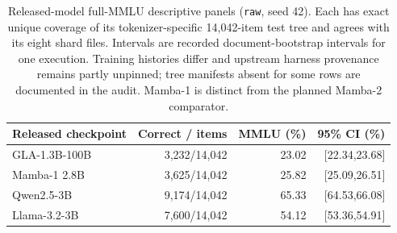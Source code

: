 \begin{table}[t]
\centering\small
\begin{tabular}{@{}lrrr@{}}
\toprule
Released checkpoint & Correct / items & MMLU (\%) & 95\% CI (\%)\\
\midrule
GLA-1.3B-100B & 3,232/14,042 & 23.02 & [22.34,23.68]\\
Mamba-1 2.8B & 3,625/14,042 & 25.82 & [25.09,26.51]\\
Qwen2.5-3B & 9,174/14,042 & 65.33 & [64.53,66.08]\\
Llama-3.2-3B & 7,600/14,042 & 54.12 & [53.36,54.91]\\
\bottomrule
\end{tabular}
\caption{Released-model full-MMLU descriptive panels (\texttt{raw}, seed 42). Each has exact unique coverage of its tokenizer-specific 14,042-item test tree and agrees with its eight shard files. Intervals are recorded document-bootstrap intervals for one execution. Training histories differ and upstream harness provenance remains partly unpinned; tree manifests absent for some rows are documented in the audit. Mamba-1 is distinct from the planned Mamba-2 comparator.}
\label{tab:additional-baseline-audit}
\end{table}
